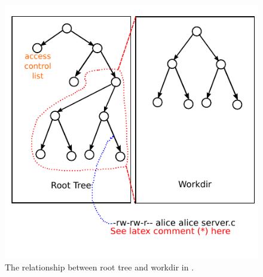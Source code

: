 \begin{figure}[t]
\centerline{\includegraphics{fig/datamodel.pdf}}
\caption{The relationship between root tree and workdir in \sys.}
\label{f:data-model}
\end{figure}

\endinput

(*) We need a better way to represent the content on the edge. Mike, do you have
any advice?

